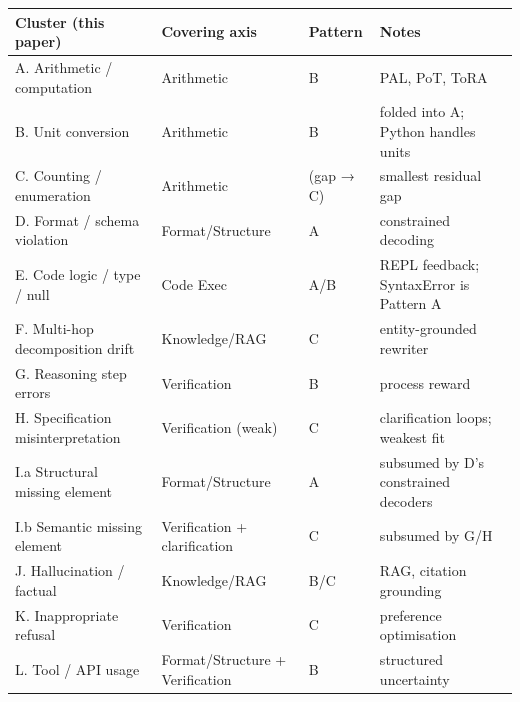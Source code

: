\documentclass[
]{article}
\newcounter{none} %
\begin{document}
{\def\LTcaptype{none} %
\begin{longtable}[]{@{}
  >{\raggedright\arraybackslash}p{}
  >{\raggedright\arraybackslash}p{}
  >{\raggedright\arraybackslash}p{}
  >{\raggedright\arraybackslash}p{}@{}}
\toprule\noalign{}
\begin{minipage}[b]{\linewidth}\raggedright
Cluster (this paper)
\end{minipage} & \begin{minipage}[b]{\linewidth}\raggedright
Covering axis
\end{minipage} & \begin{minipage}[b]{\linewidth}\raggedright
Pattern
\end{minipage} & \begin{minipage}[b]{\linewidth}\raggedright
Notes
\end{minipage} \\
\midrule\noalign{}
\endhead
\bottomrule\noalign{}
\endlastfoot
A. Arithmetic / computation & Arithmetic & B & PAL, PoT, ToRA \\
B. Unit conversion & Arithmetic & B & folded into A; Python handles
units \\
C. Counting / enumeration & Arithmetic & (gap → C) & smallest residual
gap \\
D. Format / schema violation & Format/Structure & A & constrained
decoding \\
E. Code logic / type / null & Code Exec & A/B & REPL feedback;
SyntaxError is Pattern A \\
F. Multi-hop decomposition drift & Knowledge/RAG & C & entity-grounded
rewriter \\
G. Reasoning step errors & Verification & B & process reward \\
H. Specification misinterpretation & Verification (weak) & C &
clarification loops; weakest fit \\
I.a Structural missing element & Format/Structure & A & subsumed by D's
constrained decoders \\
I.b Semantic missing element & Verification + clarification & C &
subsumed by G/H \\
J. Hallucination / factual & Knowledge/RAG & B/C & RAG, citation
grounding \\
K. Inappropriate refusal & Verification & C & preference optimisation \\
L. Tool / API usage & Format/Structure + Verification & B & structured
uncertainty \\
\end{longtable}
}
\end{document}
